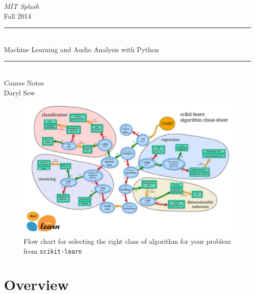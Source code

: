 \documentclass[11pt]{article}
\begin{document}
\begin{titlepage}
\begin{center}
\textsl{\huge MIT Splash}\\[0.5cm]
{\huge Fall 2014}\\[0.2cm]
\rule{\linewidth}{0.5mm}\\[0.2cm]
{\Huge Machine Learning and Audio Analysis with Python}
\rule{\linewidth}{0.5mm}\\[0.4cm]
\huge Course Notes\\[0.2cm]
\large Daryl Sew
\begin{figure}[h!]
    \centering
        \includegraphics[scale=0.13]{ml_map.png}
        \caption{Flow chart for selecting the right class of algorithm for your problem from \texttt{scikit-learn} }
\end{figure}
\end{center}
\end{titlepage}

\pagestyle{fancy}
\fancyhf{}
\setlength{\headheight}{30pt}
\renewcommand{\headrulewidth}{0.4pt}
\renewcommand{\footrulewidth}{0.4pt}

\cfoot{\thepage}

\tableofcontents
\pagebreak

\section{Overview}
\end{document}
